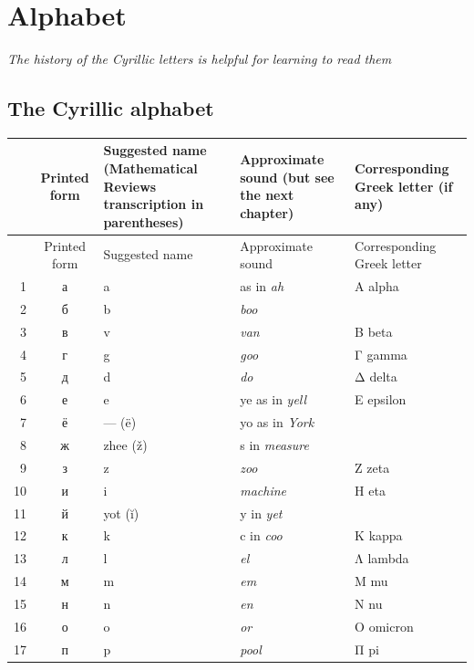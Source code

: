 \chapter{Alphabet}

\begin{sourcebox}
\centering\itshape
The history of the Cyrillic letters is helpful for learning to read them
\end{sourcebox}

\section{The Cyrillic alphabet}

\begingroup
\small
\setlength{\tabcolsep}{4pt}
\renewcommand{\arraystretch}{1.05}
\begin{longtable}{@{}r >{\cyrillicfont}c p{36mm} p{48mm} p{28mm}@{}}
\toprule
 & \normalfont Printed form & Suggested name (Mathematical Reviews transcription in parentheses) & Approximate sound (but see the next chapter) & Corresponding Greek letter (if any)\\
\midrule
\endfirsthead
\toprule
 & \normalfont Printed form & Suggested name & Approximate sound & Corresponding Greek letter\\
\midrule
\endhead
1 & а & a & as in \emph{ah} & Α alpha\\
2 & б & b & \emph{boo} & \\
3 & в & v & \emph{van} & Β beta\\
4 & г & g & \emph{goo} & Γ gamma\\
5 & д & d & \emph{do} & Δ delta\\
6 & е & e & ye as in \emph{yell} & Ε epsilon\\
7 & ё & --- (ë) & yo as in \emph{York} & \\
8 & ж & zhee (ž) & s in \emph{measure} & \\
9 & з & z & \emph{zoo} & Ζ zeta\\
10 & и & i & \emph{machine} & Η eta\\
11 & й & yot (ĭ) & y in \emph{yet} & \\
12 & к & k & c in \emph{coo} & Κ kappa\\
13 & л & l & \emph{el} & Λ lambda\\
14 & м & m & \emph{em} & Μ mu\\
15 & н & n & \emph{en} & Ν nu\\
16 & о & o & \emph{or} & Ο omicron\\
17 & п & p & \emph{pool} & Π pi\\

\end{longtable}
